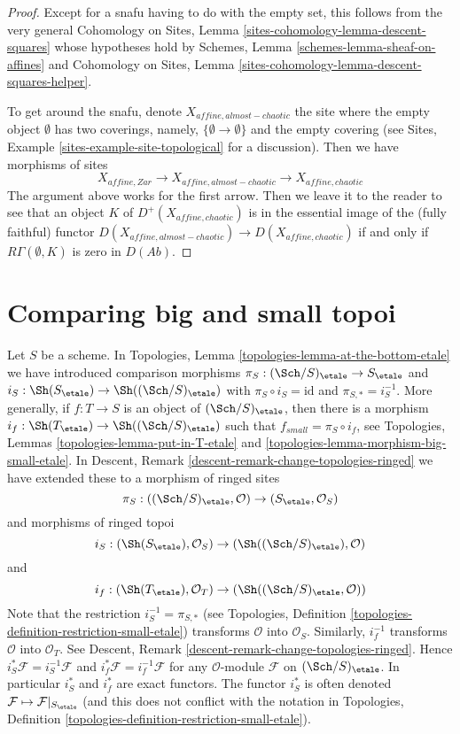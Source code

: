 \begin{proof}
Except for a snafu having to do with the empty set,
this follows from the very general Cohomology on Sites, Lemma
\ref{sites-cohomology-lemma-descent-squares} whose hypotheses hold by
Schemes, Lemma \ref{schemes-lemma-sheaf-on-affines} and
Cohomology on Sites, Lemma
\ref{sites-cohomology-lemma-descent-squares-helper}.

\medskip\noindent
To get around the snafu, denote $X_{affine, almost-chaotic}$
the site where the empty object $\emptyset$ has two coverings,
namely, $\{\emptyset \to \emptyset\}$ and the empty covering
(see Sites, Example \ref{sites-example-site-topological} for a
discussion). Then we have morphisms of sites
$$
X_{affine, Zar} \to X_{affine, almost-chaotic} \to X_{affine, chaotic}
$$
The argument above works for the first arrow. Then we leave it
to the reader to see that an object $K$ of $D^+(X_{affine, chaotic})$
is in the essential image of the (fully faithful) functor
$D(X_{affine, almost-chaotic}) \to D(X_{affine, chaotic})$ if and only
if $R\Gamma(\emptyset, K)$ is zero in $D(\textit{Ab})$.
\end{proof}









\section{Comparing big and small topoi}
\label{section-compare}

\noindent
Let $S$ be a scheme. In
Topologies, Lemma \ref{topologies-lemma-at-the-bottom-etale}
we have introduced comparison morphisms
$\pi_S : (\Sch/S)_\etale \to S_\etale$ and
$i_S : \Sh(S_\etale) \to \Sh((\Sch/S)_\etale)$
with $\pi_S \circ i_S = \text{id}$ and $\pi_{S, *} = i_S^{-1}$.
More generally, if $f : T \to S$ is an object of $(\Sch/S)_\etale$,
then there is a morphism $i_f : \Sh(T_\etale) \to \Sh((\Sch/S)_\etale)$
such that $f_{small} = \pi_S \circ i_f$, see
Topologies, Lemmas \ref{topologies-lemma-put-in-T-etale} and
\ref{topologies-lemma-morphism-big-small-etale}. In
Descent, Remark \ref{descent-remark-change-topologies-ringed}
we have extended these to a morphism of ringed sites
$$
\pi_S : ((\Sch/S)_\etale, \mathcal{O}) \to (S_\etale, \mathcal{O}_S)
$$
and morphisms of ringed topoi
$$
i_S : (\Sh(S_\etale), \mathcal{O}_S) \to (\Sh((\Sch/S)_\etale), \mathcal{O})
$$
and
$$
i_f : (\Sh(T_\etale), \mathcal{O}_T) \to (\Sh((\Sch/S)_\etale, \mathcal{O}))
$$
Note that the restriction $i_S^{-1} = \pi_{S, *}$ (see
Topologies, Definition \ref{topologies-definition-restriction-small-etale})
transforms $\mathcal{O}$ into $\mathcal{O}_S$.
Similarly, $i_f^{-1}$ transforms $\mathcal{O}$ into $\mathcal{O}_T$.
See Descent, Remark \ref{descent-remark-change-topologies-ringed}.
Hence $i_S^*\mathcal{F} = i_S^{-1}\mathcal{F}$ and
$i_f^*\mathcal{F} = i_f^{-1}\mathcal{F}$ for any $\mathcal{O}$-module
$\mathcal{F}$ on $(\Sch/S)_\etale$. In particular $i_S^*$ and $i_f^*$
are exact functors. The functor $i_S^*$ is often denoted
$\mathcal{F} \mapsto \mathcal{F}|_{S_\etale}$ (and this does not
conflict with the notation in
Topologies, Definition \ref{topologies-definition-restriction-small-etale}).


